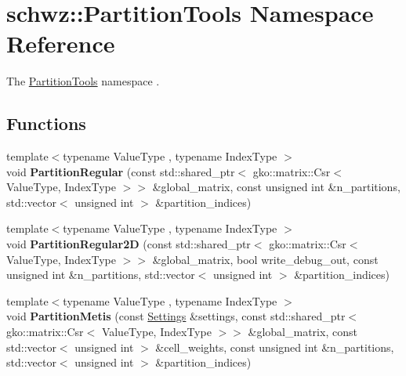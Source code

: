 \hypertarget{namespaceschwz_1_1PartitionTools}{}\section{schwz\+:\+:Partition\+Tools Namespace Reference}
\label{namespaceschwz_1_1PartitionTools}


The \hyperlink{namespaceschwz_1_1PartitionTools}{Partition\+Tools} namespace .  


\subsection*{Functions}
\begin{DoxyCompactItemize}
\item 
\mbox{\label{namespaceschwz_1_1PartitionTools_a8704c901dcdadbe942f2efbe118b3755}} 
{\footnotesize template$<$typename Value\+Type , typename Index\+Type $>$ }\\void {\bfseries Partition\+Regular} (const std\+::shared\+\_\+ptr$<$ gko\+::matrix\+::\+Csr$<$ Value\+Type, Index\+Type $>$$>$ \&global\+\_\+matrix, const unsigned int \&n\+\_\+partitions, std\+::vector$<$ unsigned int $>$ \&partition\+\_\+indices)
\item 
\mbox{\label{namespaceschwz_1_1PartitionTools_ab7e001c062718aa83b5a4be768c10278}} 
{\footnotesize template$<$typename Value\+Type , typename Index\+Type $>$ }\\void {\bfseries Partition\+Regular2D} (const std\+::shared\+\_\+ptr$<$ gko\+::matrix\+::\+Csr$<$ Value\+Type, Index\+Type $>$$>$ \&global\+\_\+matrix, bool write\+\_\+debug\+\_\+out, const unsigned int \&n\+\_\+partitions, std\+::vector$<$ unsigned int $>$ \&partition\+\_\+indices)
\item 
\mbox{\label{namespaceschwz_1_1PartitionTools_ad29c7a2a6d130f422f7333886c53332c}} 
{\footnotesize template$<$typename Value\+Type , typename Index\+Type $>$ }\\void {\bfseries Partition\+Metis} (const \hyperlink{structschwz_1_1Settings}{Settings} \&settings, const std\+::shared\+\_\+ptr$<$ gko\+::matrix\+::\+Csr$<$ Value\+Type, Index\+Type $>$$>$ \&global\+\_\+matrix, const std\+::vector$<$ unsigned int $>$ \&cell\+\_\+weights, const unsigned int \&n\+\_\+partitions, std\+::vector$<$ unsigned int $>$ \&partition\+\_\+indices)
$$
\end{DoxyCompactItemize}
